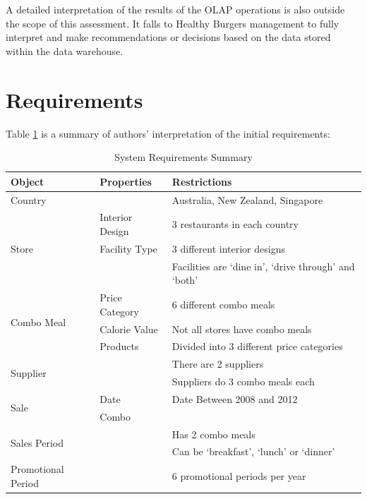 \documentclass[12pt, a4paper]{article}
\begin{document}
A detailed interpretation of the results of the OLAP operations is also outside the scope of this assessment. It falls to Healthy Burgers management to fully interpret and make recommendations or decisions based on the data stored within the data warehouse.

\section*{Requirements}

Table \ref{tab:requirements} is a summary of authors' interpretation of the initial requirements:

\begin{table}

\begin{tabular}{|l|l|l|}

\hline
\textbf{Object} & \textbf{Properties} & \textbf{Restrictions} \\
\hline

Country & & Australia, New Zealand, Singapore \\
\hline

\multirow{3}{3cm}{Store} & Interior Design  & 3 restaurants in each country \\
 	& Facility Type & 3 different interior designs \\
	& & Facilities are `dine in', `drive through' and `both' \\
\hline

\multirow{3}{3cm}{Combo Meal} & Price Category & 6 different combo meals \\
	& Calorie Value & Not all stores have combo meals \\
	& Products & Divided into 3 different price categories \\ 

\hline

\multirow{2}{3cm}{Supplier} & & There are 2 suppliers \\ 
	& & Suppliers do 3 combo meals each\\
\hline

\multirow{2}{3cm}{Sale} & Date & Date Between 2008 and 2012 \\
	& Combo &  \\
\hline

\multirow{2}{3cm}{Sales Period} & & Has 2 combo meals \\ 
	& & Can be `breakfast', `lunch' or `dinner' \\
\hline	

Promotional Period & & 6 promotional periods per year\\

\hline

\end{tabular}

\caption{System Requirements Summary}
\label{tab:requirements}

\end{table}
\end{document}
